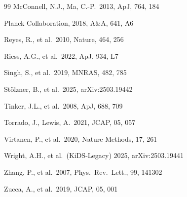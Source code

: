 \documentclass[12pt,a4paper]{article}
\begin{document}
\begin{thebibliography}{99}
 McConnell, N.J., Ma, C.-P.\ 2013, ApJ, 764, 184

 Planck Collaboration, 2018, A\&A, 641, A6

 Reyes, R., et al.\ 2010, Nature, 464, 256

 Riess, A.G., et al.\ 2022, ApJ, 934, L7

 Singh, S., et al.\ 2019, MNRAS, 482, 785

 St\"{o}lzner, B., et al.\ 2025, arXiv:2503.19442

 Tinker, J.L., et al.\ 2008, ApJ, 688, 709

 Torrado, J., Lewis, A.\ 2021, JCAP, 05, 057

 Virtanen, P., et al.\ 2020, Nature Methods, 17, 261

 Wright, A.H., et al.\ (KiDS-Legacy) 2025, arXiv:2503.19441

 Zhang, P., et al.\ 2007, Phys.\ Rev.\ Lett., 99, 141302

 Zucca, A., et al.\ 2019, JCAP, 05, 001

\end{thebibliography}
\end{document}
